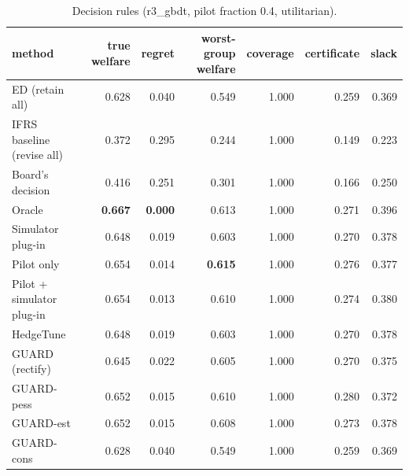 \begin{table}[t]
\centering
\small
\begin{tabular}{lrrrrrr}
\toprule
method & true welfare & regret & worst-group welfare & coverage & certificate & slack \\
\midrule
ED (retain all) & 0.628 & 0.040 & 0.549 & 1.000 & 0.259 & 0.369 \\
IFRS baseline (revise all) & 0.372 & 0.295 & 0.244 & 1.000 & 0.149 & 0.223 \\
Board's decision & 0.416 & 0.251 & 0.301 & 1.000 & 0.166 & 0.250 \\
Oracle & \textbf{0.667} & \textbf{0.000} & 0.613 & 1.000 & 0.271 & 0.396 \\
Simulator plug-in & 0.648 & 0.019 & 0.603 & 1.000 & 0.270 & 0.378 \\
Pilot only & 0.654 & 0.014 & \textbf{0.615} & 1.000 & 0.276 & 0.377 \\
Pilot + simulator plug-in & 0.654 & 0.013 & 0.610 & 1.000 & 0.274 & 0.380 \\
HedgeTune & 0.648 & 0.019 & 0.603 & 1.000 & 0.270 & 0.378 \\
GUARD (rectify) & 0.645 & 0.022 & 0.605 & 1.000 & 0.270 & 0.375 \\
GUARD-pess & 0.652 & 0.015 & 0.610 & 1.000 & 0.280 & 0.372 \\
GUARD-est & 0.652 & 0.015 & 0.608 & 1.000 & 0.273 & 0.378 \\
GUARD-cons & 0.628 & 0.040 & 0.549 & 1.000 & 0.259 & 0.369 \\
\bottomrule
\end{tabular}
\caption{Decision rules (r3\_gbdt, pilot fraction 0.4, utilitarian).}
\label{tab:methods-utilitarian}
\end{table}
